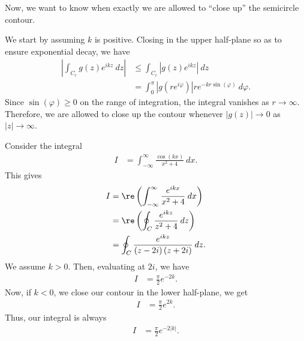 \documentclass[10pt]{mypackage}
\begin{document}
   Now, we want to know when exactly we are allowed to ``close up'' the semicircle contour.\newline

   We start by assuming $k$ is positive. Closing in the upper half-plane so as to ensure exponential decay, we have
   \begin{align*}
     \left\vert \int_{C_r}^{} g(z)e^{ikz}\:dz \right\vert &\leq \int_{C_r}^{} \left\vert g(z)e^{ikz} \right\vert\:dz\\
                                                          &= \int_{0}^{\pi} \left\vert g\left( re^{i\varphi} \right) \right\vert re^{-kr\sin\left( \varphi \right)}\:d\varphi.
   \end{align*}
   Since $\sin\left( \varphi \right) \geq 0$ on the range of integration, the integral vanishes as $r\rightarrow\infty$. Therefore, we are allowed to close up the contour whenever $|g(z)|\rightarrow 0$ as $|z|\rightarrow\infty$.
   \begin{example}
     Consider the integral
     \begin{align*}
       I &= \int_{-\infty}^{\infty} \frac{\cos\left( kx \right)}{x^2 + 4}\:dx.
     \end{align*}
     This gives
     \begin{align*}
       I &= \re\left( \int_{-\infty}^{\infty} \frac{e^{ikx}}{x^2 + 4}\:dx \right)\\
         &= \re\left( \oint_{C}\frac{e^{ikz}}{z^2 + 4}\:dz \right)\\
         &= \oint_{C}^{} \frac{e^{ikz}}{\left( z-2i \right)\left( z+2i \right)}\:dz.
     \end{align*}
     We assume $k > 0$. Then, evaluating at $2i$, we have
     \begin{align*}
       I &= \frac{\pi}{2}e^{-2k}.
     \end{align*}
     Now, if $k < 0$, we close our contour in the lower half-plane, we get
     \begin{align*}
       I &= \frac{\pi}{2}e^{2k}.
     \end{align*}
     Thus, our integral is always
     \begin{align*}
       I &= \frac{\pi}{2}e^{-2\left\vert k \right\vert}.
     \end{align*}
   \end{example}
\end{document}
